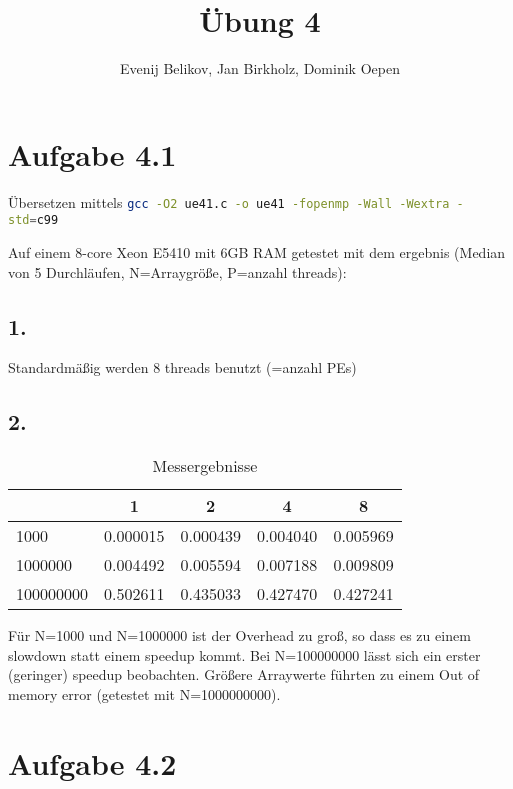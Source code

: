 \documentclass{scrartcl}
\begin{document}
\title{Übung 4}
\author{Evenij Belikov, Jan Birkholz, Dominik Oepen}
\maketitle

\section*{Aufgabe 4.1}

Übersetzen mittels \lstinline[language=Bash]$gcc -O2 ue41.c -o ue41 -fopenmp -Wall -Wextra -std=c99$



Auf einem 8-core Xeon E5410 mit 6GB RAM getestet mit dem ergebnis
(Median von 5 Durchläufen, N=Arraygröße, P=anzahl threads):

\subsection*{1.}

Standardmäßig werden 8 threads benutzt (=anzahl PEs)

\subsection*{2.}

\begin{table}[htp]
	\begin{center}
	\begin{tabular}{l|cccc}
		\toprule
		\backslashbox{N}{P}	&	1	&	2	&	4	&	8	\\
		\midrule
		1000	& 0.000015 & 0.000439 & 0.004040 & 0.005969 \\
		1000000 & 0.004492 & 0.005594 & 0.007188 & 0.009809 \\
		100000000 & 0.502611 & 0.435033 & 0.427470 & 0.427241 \\
		\bottomrule
	\end{tabular}
	\label{tab:results}
	\caption{Messergebnisse}
	\end{center}
\end{table}

Für N=1000 und N=1000000 ist der Overhead zu groß, so dass es zu einem slowdown statt einem speedup kommt. Bei N=100000000 lässt sich ein erster (geringer) speedup beobachten. Größere Arraywerte führten zu einem Out of memory error (getestet mit N=1000000000).

\section*{Aufgabe 4.2}
\end{document}
